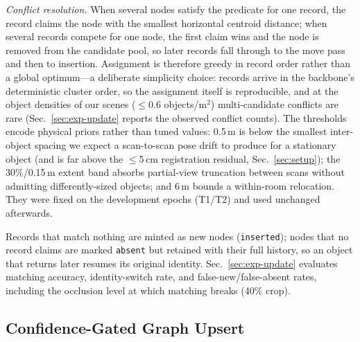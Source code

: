 \emph{Conflict resolution.} When several nodes satisfy the predicate for one
record, the record claims the node with the smallest horizontal centroid
distance; when several records compete for one node, the first claim wins
and the node is removed from the candidate pool, so later records fall
through to the move pass and then to insertion. Assignment is therefore
greedy in record order rather than a global optimum---a deliberate
simplicity choice: records arrive in the backbone's deterministic cluster
order, so the assignment itself is reproducible, and at the object densities
of our scenes ($\le$0.6 objects/m$^2$) multi-candidate conflicts are rare
(Sec.~\ref{sec:exp-update} reports the observed conflict counts).
The thresholds encode physical priors rather than tuned values: 0.5\,m is
below the smallest inter-object spacing we expect a scan-to-scan pose drift
to produce for a stationary object (and is far above the $\le$5\,cm
registration residual, Sec.~\ref{sec:setup}); the 30\%/0.15\,m extent band
absorbs partial-view truncation between scans without admitting
differently-sized objects; and 6\,m bounds a within-room relocation. They
were fixed on the development epochs (T1/T2) and used unchanged afterwards.

Records that match nothing are minted as new nodes (\texttt{inserted});
nodes that no record claims are marked \texttt{absent} but retained with
their full history, so an object that returns later resumes its original
identity. Sec.~\ref{sec:exp-update} evaluates matching accuracy, identity-switch rate, and
false-new/false-absent rates, including the occlusion level at which
matching breaks (40\% crop).

\subsection{Confidence-Gated Graph Upsert}
\label{sec:upsert}

